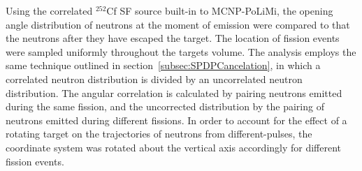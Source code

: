 Using the correlated $^{252}$Cf SF source built-in to MCNP-PoLiMi, the opening angle distribution of neutrons at the moment of emission were compared to that the neutrons after they have escaped the target.
The location of fission events were sampled uniformly throughout the targets volume.
The analysis employs the same technique outlined in section~\ref{subsec:SPDPCancelation}, in which a correlated neutron distribution is divided by an uncorrelated neutron distribution.
The angular correlation is calculated by pairing neutrons emitted during the same fission, and the uncorrected distribution by the pairing of neutrons emitted during different fissions.
In order to account for the effect of a rotating target on the trajectories of neutrons from different-pulses, the coordinate system was rotated about the vertical axis accordingly for different fission events.

